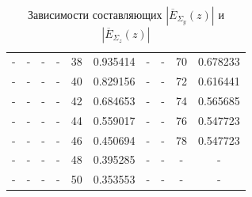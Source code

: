 \documentclass[11pt,a4paper,oneside, titlepage,reqno]{amsproc}
\begin{document}
\begin{centering}
\begin{table}[h!]
\begin{adjustwidth}{-1cm}{}
\begin{tabular}{cccccccccc}
-   &  -         &  -   &  -         &  38  &  0.935414  & -   &  -         &  70  &  0.678233  \\
-   &  -         &  -   &  -         &  40  &  0.829156  & -   &  -         &  72  &  0.616441  \\
-   &  -         &  -   &  -         &  42  &  0.684653  & -   &  -         &  74  &  0.565685  \\
-   &  -         &  -   &  -         &  44  &  0.559017  & -   &  -         &  76  &  0.547723  \\
-   &  -         &  -   &  -         &  46  &  0.450694  & -   &  -         &  78  &  0.547723  \\
-   &  -         &  -   &  -         &  48  &  0.395285  & -   &  -         &  -   &  -         \\
-   &  -         &  -   &  -         &  50  &  0.353553  & -   &  -         &  -   &  -         \\
\bottomrule
\end{tabular}
\vspace{5 pt}
\caption{Зависимости составляющих $|\overline{E}_{\Sigma_y}(z)|$ и $|\overline{E}_{\Sigma_z}(z)|$} 
\end{adjustwidth}
\label{tab:tab1}
\end{table}
\end{centering}
\end{document}
